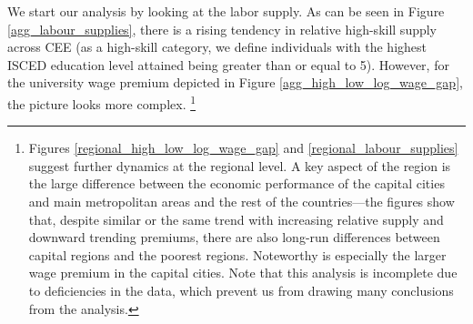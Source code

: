 \documentclass[11pt]{article}
\begin{document}
We start our analysis by looking at the labor supply. As can be seen in Figure \ref{agg_labour_supplies}, there is a rising tendency in relative high-skill supply across CEE (as a high-skill category, we define individuals with the highest ISCED education level attained being greater than or equal to 5). However, for the university wage premium depicted in Figure \ref{agg_high_low_log_wage_gap}, the picture looks more complex.%
\footnote{Figures \ref{regional_high_low_log_wage_gap} and \ref{regional_labour_supplies} suggest further dynamics at the regional level. A key aspect of the region is the large difference between the economic performance of the capital cities and main metropolitan areas and the rest of the countries—the figures show that, despite similar or the same trend with increasing relative supply and downward trending premiums, there are also long-run differences between capital regions and the poorest regions. Noteworthy is especially the larger wage premium in the capital cities. Note that this analysis is incomplete due to deficiencies in the data, which prevent us from drawing many conclusions from the analysis.}
\end{document}
